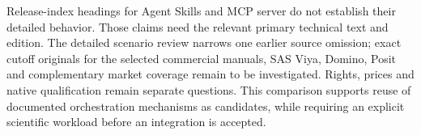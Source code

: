 Release-index headings for Agent Skills and MCP server do not establish their
detailed behavior. Those claims need the relevant primary technical text and
edition. The detailed scenario review narrows one earlier source omission;
exact cutoff originals for the selected commercial manuals, SAS Viya, Domino,
Posit and complementary market coverage remain to be investigated. Rights,
prices and native qualification remain separate questions. This comparison
supports reuse of documented orchestration mechanisms as candidates, while
requiring an explicit scientific workload before an integration is accepted.
